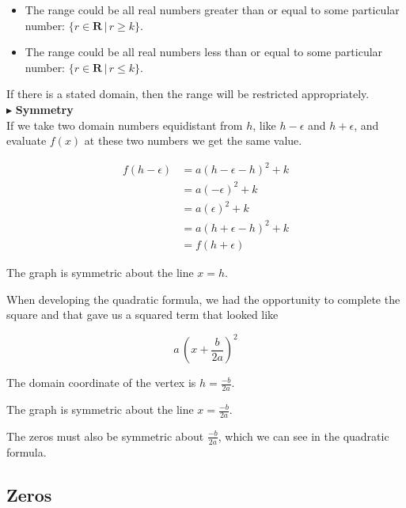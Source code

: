 \documentclass{ximera}
\begin{document}
\begin{itemize}
\item The range could be all real numbers greater than or equal to some particular number:  $\{ r \in \textbf{R} \, | \, r \geq k \}$.
\item The range could be all real numbers less than or equal to some particular number:  $\{ r \in \textbf{R} \, | \, r \leq k \}$.
\end{itemize}

If there is a stated domain, then the range will be restricted appropriately. \\






$\blacktriangleright$ \textbf{Symmetry}   \\


If we take two domain numbers equidistant from $h$, like $h - \epsilon$ and $h + \epsilon$, and evaluate $f(x)$ at these two numbers we get the same value.


\begin{align*}
f(h - \epsilon) & = a (h - \epsilon - h)^2 + k \\
& = a (-\epsilon)^2 + k  \\
& = a (\epsilon)^2 + k  \\
& = a (h + \epsilon - h)^2 + k \\
& = f(h + \epsilon)
\end{align*}


The graph is symmetric about the line $x = h$.


When developing the quadratic formula, we had the opportunity to complete the square and that gave us a squared term that looked like 

\[  a \, \left(x + \frac{b}{2a}\right)^2       \]


The domain coordinate of the vertex is $h = \frac{-b}{2a}$.


The graph is symmetric about the line $x = \frac{-b}{2a}$.






The zeros must also be symmetric about $\frac{-b}{2a}$, which we can see in the quadratic formula. \\




\subsection{Zeros}
\end{document}
